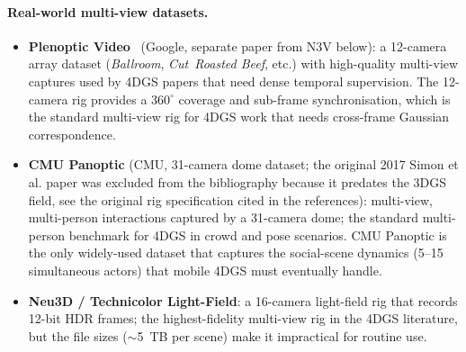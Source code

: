 \paragraph{Real-world multi-view datasets.}
\begin{itemize}
  \item \textbf{Plenoptic Video}~\cite{li2022plenopticvideostream} (Google, separate paper from N3V below): a
        12-camera array dataset (\emph{Ballroom}, \emph{Cut~Roasted
        Beef}, etc.) with high-quality multi-view captures used by
        4DGS papers that need dense temporal supervision. The
        12-camera rig provides a $360^{\circ}$ coverage and
        sub-frame synchronisation, which is the standard
        multi-view rig for 4DGS work that needs cross-frame
        Gaussian correspondence.
  \item \textbf{CMU Panoptic} (CMU, 31-camera dome dataset; the original 2017 Simon et al. paper was excluded from the bibliography because it predates the 3DGS field, see the original rig specification cited in the references): multi-view,
        multi-person interactions captured by a 31-camera dome;
        the standard multi-person benchmark for 4DGS in crowd
        and pose scenarios. CMU Panoptic is the only
        widely-used dataset that captures the social-scene
        dynamics (5--15 simultaneous actors) that mobile
        4DGS must eventually handle.
  \item \textbf{Neu3D / Technicolor Light-Field}: a
        16-camera light-field rig that records 12-bit HDR
        frames; the highest-fidelity multi-view rig in the
        4DGS literature, but the file sizes ($\sim$5~TB per
        scene) make it impractical for routine use.
\end{itemize}

